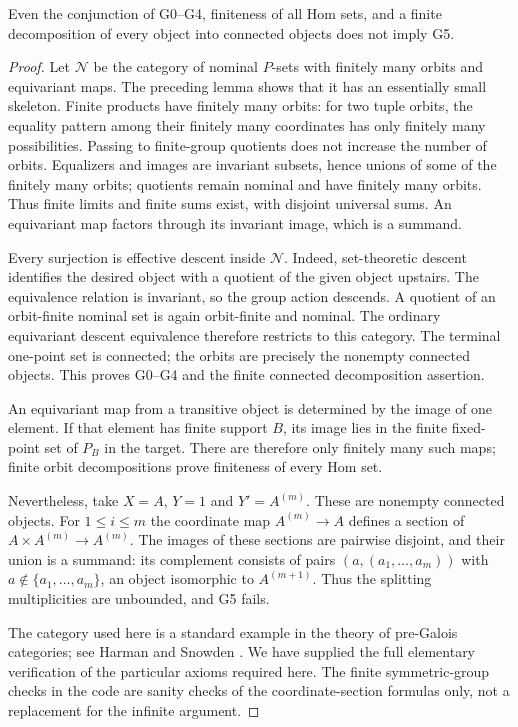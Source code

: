 \begin{proposition}\label{D:G5-Hom-finite}
Even the conjunction of G0--G4, finiteness of all Hom sets, and a finite
decomposition of every object into connected objects does not imply G5.
\end{proposition}
\begin{proof}
Let $\mathcal N$ be the category of nominal $P$-sets with finitely
many orbits and equivariant maps. The preceding lemma shows that it
has an essentially small skeleton. Finite products have finitely many
orbits: for two tuple orbits, the equality pattern among their finitely
many coordinates has only finitely many possibilities. Passing to
finite-group quotients does not increase the number of orbits.
Equalizers and images are invariant subsets, hence unions of some of
the finitely many orbits; quotients remain nominal and have finitely
many orbits. Thus finite limits and finite sums exist, with disjoint
universal sums. An equivariant map factors through its invariant image,
which is a summand.

Every surjection is effective descent inside $\mathcal N$. Indeed,
set-theoretic descent identifies the desired object with a quotient
of the given object upstairs. The equivalence relation is invariant,
so the group action descends. A quotient of an orbit-finite nominal
set is again orbit-finite and nominal. The ordinary equivariant
descent equivalence therefore restricts to this category. The terminal
one-point set is connected; the orbits are precisely the nonempty
connected objects. This proves G0--G4 and the finite connected
decomposition assertion.

An equivariant map from a transitive object is determined by the image
of one element. If that element has finite support $B$, its image lies
in the finite fixed-point set of $P_B$ in the target. There are therefore
only finitely many such maps; finite orbit decompositions prove finiteness
of every Hom set.

Nevertheless, take $X=A$, $Y=1$ and $Y'=A^{(m)}$. These are nonempty
connected objects. For $1\leq i\leq m$ the coordinate map
$A^{(m)}\to A$ defines a section of
$A\times A^{(m)}\to A^{(m)}$. The images of these sections are
pairwise disjoint, and their union is a summand: its complement consists
of pairs $(a,(a_1,\ldots,a_m))$ with $a\notin\{a_1,\ldots,a_m\}$,
an object isomorphic to $A^{(m+1)}$. Thus the splitting multiplicities
are unbounded, and G5 fails.

The category used here is a standard example in the theory of
pre-Galois categories; see Harman and Snowden \cite{HarmanSnowden}.
We have supplied the full elementary verification of the particular
axioms required here. The finite symmetric-group checks in the code
are sanity checks of the coordinate-section formulas only, not a
replacement for the infinite argument.
\end{proof}

